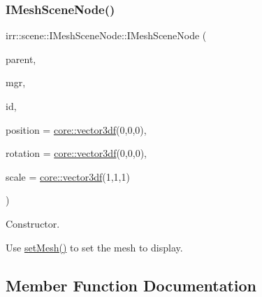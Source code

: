 \subsubsection{\texorpdfstring{I\+Mesh\+Scene\+Node()}{IMeshSceneNode()}\hspace{0.1cm}{\footnotesize\ttfamily [2/2]}}
{\footnotesize\ttfamily irr\+::scene\+::\+I\+Mesh\+Scene\+Node\+::\+I\+Mesh\+Scene\+Node (\begin{DoxyParamCaption}\item[{\hyperlink{classirr_1_1scene_1_1ISceneNode}{I\+Scene\+Node} $\ast$}]{parent,  }\item[{\hyperlink{classirr_1_1scene_1_1ISceneManager}{I\+Scene\+Manager} $\ast$}]{mgr,  }\item[{\hyperlink{namespaceirr_ac66849b7a6ed16e30ebede579f9b47c6}{s32}}]{id,  }\item[{const \hyperlink{namespaceirr_1_1core_ae6e2b2a6c552833ebbd5b7463d03586b}{core\+::vector3df} \&}]{position = {\ttfamily \hyperlink{namespaceirr_1_1core_ae6e2b2a6c552833ebbd5b7463d03586b}{core\+::vector3df}(0,0,0)},  }\item[{const \hyperlink{namespaceirr_1_1core_ae6e2b2a6c552833ebbd5b7463d03586b}{core\+::vector3df} \&}]{rotation = {\ttfamily \hyperlink{namespaceirr_1_1core_ae6e2b2a6c552833ebbd5b7463d03586b}{core\+::vector3df}(0,0,0)},  }\item[{const \hyperlink{namespaceirr_1_1core_ae6e2b2a6c552833ebbd5b7463d03586b}{core\+::vector3df} \&}]{scale = {\ttfamily \hyperlink{namespaceirr_1_1core_ae6e2b2a6c552833ebbd5b7463d03586b}{core\+::vector3df}(1,1,1)} }\end{DoxyParamCaption})\hspace{0.3cm}{\ttfamily [inline]}}



Constructor. 

Use \hyperlink{classirr_1_1scene_1_1IMeshSceneNode_a8d7e98ddfb990bfc354c9c410a4d788f}{set\+Mesh()} to set the mesh to display. 

\subsection{Member Function Documentation}
\mbox{\label{classirr_1_1scene_1_1IMeshSceneNode_ad7cd00b302466dea891c7a0b6b28de19}} 
